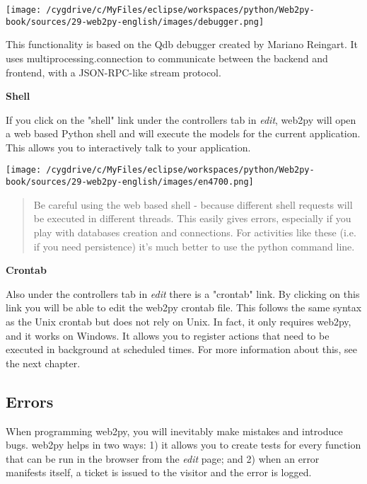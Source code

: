 \documentclass[justified,sixbynine,notoc]{tufte-book}
\def\inxx#1{\index{#1}}
\begin{document}
\begin{fullwidth}
\goodbreak\begin{center}\texttt{[image: /cygdrive/c/MyFiles/eclipse/workspaces/python/Web2py-book/sources/29-web2py-english/images/debugger.png]}\end{center}


This functionality is based on the Qdb debugger created by Mariano Reingart.
It uses multiprocessing.connection to communicate between the backend
and frontend, with a JSON-RPC-like stream protocol.~\cite{qdb}

{\bf Shell}

If you click on the "shell" link under the controllers tab in {\it edit}, web2py will open a web based Python shell and will execute the models for the current application. This allows you to interactively talk to your application.


\goodbreak\begin{center}\texttt{[image: /cygdrive/c/MyFiles/eclipse/workspaces/python/Web2py-book/sources/29-web2py-english/images/en4700.png]}\end{center}


\begin{quote}Be careful using the web based shell - because different shell requests will be executed in different threads. This easily gives errors, especially if you play with databases
creation and connections. For activities like these (i.e. if you need persistence) it's much better to use the python command line.\end{quote}
{\bf Crontab}

Also under the controllers tab in {\it edit} there is a "crontab" link. By clicking on this link you will be able to edit the web2py crontab file. This follows the same syntax as the Unix crontab but does not rely on Unix. In fact, it only requires web2py, and it works on Windows. It allows you to register actions that need to be executed in background at scheduled times.
For more information about this, see the next chapter.

\goodbreak\subsection{Errors}

\inxx{errors}

When programming web2py, you will inevitably make mistakes and introduce bugs. web2py helps in two ways: 1) it allows you to create tests for every function that can be run in the browser from the {\it edit} page; and 2) when an error manifests itself, a ticket is issued to the visitor and the error is logged.


\end{fullwidth}
\end{document}
